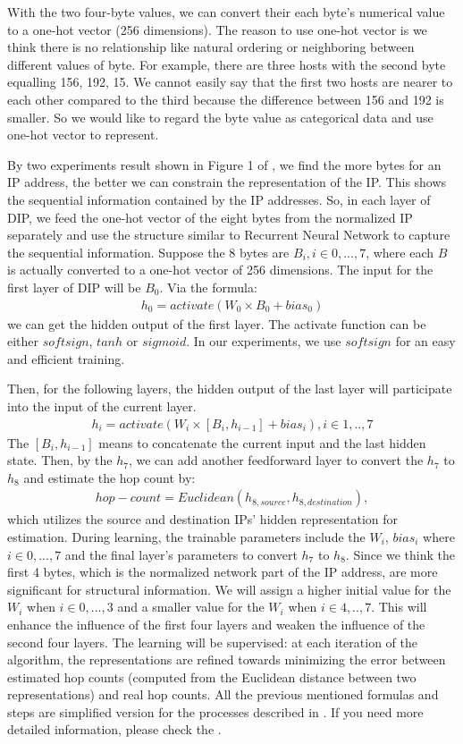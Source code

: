 With the two four-byte values, we can convert their each byte's numerical value to a one-hot vector (256 dimensions). The reason to use one-hot vector is we think there is no relationship like natural ordering or neighboring between different values of byte. For example, there are three hosts with the second byte equalling 156, 192, 15. We cannot easily say that the first two hosts are nearer to each other compared to the third because the difference between 156 and 192 is smaller. So we would like to regard the byte value as categorical data and use one-hot vector to represent. 

By two experiments result shown in Figure 1 of \citet{dip}, we  find the more bytes for an IP address, the better we can constrain the representation of the IP. This shows the sequential information contained by the IP addresses.  So, in each layer of DIP, we feed the one-hot vector of the eight bytes from the  normalized IP separately and use the structure similar to Recurrent Neural Network to capture the sequential information. Suppose the 8 bytes are $B_i, i \in {0, ..., 7}$, where each $B$ is actually converted to a one-hot vector of 256 dimensions. The input for the first layer of DIP will be $B_0$. Via  the formula:
\begin{align} 
h_{0}=activate(W_0 \times B_0 + bias_0)
\end{align}
we can get the hidden output of the first layer. The activate function can be either $softsign$, $tanh$ or $sigmoid$. In our experiments, we use $softsign$ for an easy and efficient training.

Then, for the following layers, the hidden output of the last layer will participate into the input of the current layer. 
\begin{align} 
h_{i}=activate(W_i \times [B_i, h_{i-1}] + bias_i), i \in {1, .. , 7} 
\end{align}
The $[B_i, h_{i-1}]$ means to concatenate the current input and the last hidden state. 
Then, by the $h_7$, we can add another feedforward layer to convert the $h_7$ to $h_8$ and estimate the hop count by:
\begin{align} 
hop-count = Euclidean (h_{8,source}, h_{8, destination}),
\end{align}
which utilizes the source and destination IPs' hidden representation for estimation. During learning, the trainable parameters include the $W_i$, $bias_i$ where $i\in {0,...,7}$ and the final layer's parameters to convert $h_7$ to $h_8$. Since we think the first 4 bytes, which is the normalized network part of the IP address, are more significant for structural information. We will assign a higher initial value for the $W_i$ when $i\in {0,...,3}$ and a smaller value for the $W_i$ when $i \in {4,..,7}$. This will enhance the influence of the first four layers and weaken the influence of the second four layers. The learning will be supervised: at each iteration of the algorithm, the representations are refined towards minimizing the error between estimated hop counts (computed from the Euclidean distance between two representations) and real hop counts. 
All the previous mentioned formulas and steps are simplified version for the processes described in \citet{dip}. If you need more detailed information, please check the \citet{dip}. 

